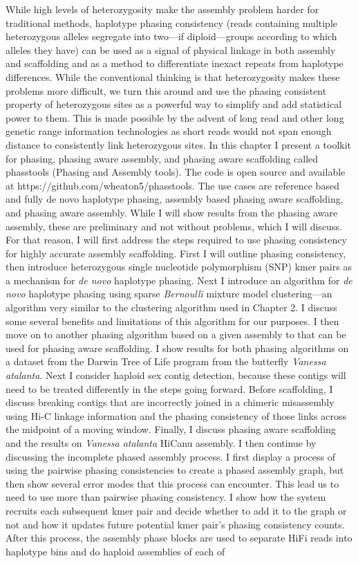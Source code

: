 \par{
While high levels of heterozygosity make the assembly problem harder for traditional methods, haplotype phasing consistency (reads containing multiple heterozygous alleles segregate into two---if diploid---groups according to which alleles they have) can be used as a signal of physical linkage in both assembly and scaffolding and as a method to differentiate inexact repeats from haplotype differences. While the conventional thinking is that heterozygosity makes these problems more difficult, we turn this around and use the phasing consistent property of heterozygous sites as a powerful way to simplify and add statistical power to them. This is made possible by the advent of long read and other long genetic range information technologies as short reads would not span enough distance to consistently link heterozygous sites. In this chapter I present a toolkit for phasing, phasing aware assembly, and phasing aware scaffolding called phasstools (Phasing and Assembly tools). The code is open source and available at https://github.com/wheaton5/phasstools. The use cases are reference based and fully de novo haplotype phasing, assembly based phasing aware scaffolding, and phasing aware assembly. While I will show results from the phasing aware assembly, these are preliminary and not without problems, which I will discuss. For that reason, I will first address the steps required to use phasing consistency for highly accurate assembly scaffolding. First I will outline phasing consistency, then introduce heterozygous single nucleotide polymorphism (SNP) kmer pairs as a mechanism for \textit{de novo} haplotype phasing. Next I introduce an algorithm for \textit{de novo} haplotype phasing using sparse \textit{Bernoulli} mixture model clustering---an algorithm very similar to the clustering algorithm used in Chapter 2. I discuss some several benefits and limitations of this algorithm for our purposes. I then move on to another phasing algorithm based on a given assembly to that can be used for phasing aware scaffolding. I show results for both phasing algorithms on a dataset from the Darwin Tree of Life program from the butterfly \textit{Vanessa atalanta}. Next I consider haploid sex contig detection, because these contigs will need to be treated differently in the steps going forward. Before scaffolding, I discuss breaking contigs that are incorrectly joined in a chimeric misassembly using Hi-C linkage information and the phasing consistency of those links across the midpoint of a moving window. Finally, I discuss phasing aware scaffolding and the results on \textit{Vanessa atalanta} HiCanu assembly. I then continue by discussing the incomplete phased assembly process. I first display a process of using the pairwise phasing consistencies to create a phased assembly graph, but then show several error modes that this process can encounter. This lead us to need to use more than pairwise phasing consistency. I show how the system recruits each subsequent kmer pair and decide whether to add it to the graph or not and how it updates future potential kmer pair's phasing consistency counts. After this process, the assembly phase blocks are used to separate HiFi reads into haplotype bins and do haploid assemblies of each of }
